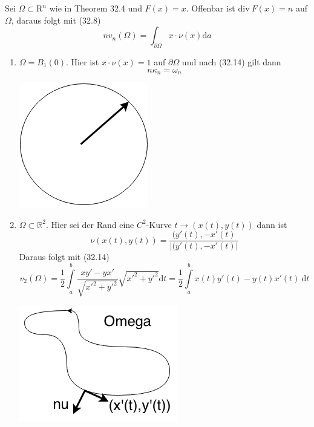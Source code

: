 \begin{beispiel}
Sei $\Omega\subset\mathrm{R}^n$ wie in Theorem 32.4 und $F(x) = 
x$. Offenbar ist $\mathrm{div\ }F(x)=n$ auf $\Omega$, daraus 
folgt mit (32.8)
\begin{equation}
	nv_n(\Omega)=\int_{\partial\Omega}x\cdot\nu(x)\mathrm{d}a
\end{equation}
\begin{enumerate}
	\item  $\Omega=B_1(0)$. Hier ist $x\cdot\nu(x)=1$ auf
			$\partial\Omega$ und nach (32.14) gilt dann
			\begin{equation*}
				n\kappa_n=\omega_n
			\end{equation*}
			\begin{center}
				\includegraphics[scale=0.5]{pictures/008-01.png}				\end{center}			 
\newpage
	\item $\Omega\subset\mathbb{R}^2$. Hier sei der Rand eine 
			$C^2$-Kurve $t\rightarrow(x(t),y(t))$ dann ist
			\begin{equation*}
				\nu(x(t),y(t)) =
				\frac{(y'(t),-x'(t)}{|(y'(t),-x'(t)|}
			\end{equation*}
			Daraus folgt mit (32.14)
			\begin{equation*}
				v_2(\Omega) = 
				\frac{1}{2}\int\limits_a^b\frac{xy'-yx'}
				{\sqrt{x'^2+y'^2}}\sqrt{x'^2+y'^2}\mathrm{d}t = 
				\frac{1}{2}\int\limits_a^bx(t)y'(t)-y(t)x'(t) \ 
				\mathrm{d}t
			\end{equation*}
			\begin{center}
				\includegraphics[scale=0.5]{pictures/008-02.png}\end{center}	
\end{enumerate}
\end{beispiel}

